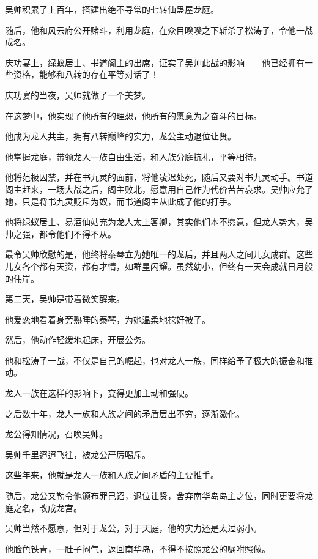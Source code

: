 
\begin{this_body}

吴帅积累了上百年，搭建出绝不寻常的七转仙蛊屋龙庭。

随后，他和风云府公开赌斗，利用龙庭，在众目睽睽之下斩杀了松涛子，令他一战成名。

庆功宴上，绿蚁居士、书道阁主的出席，证实了吴帅此战的影响——他已经拥有一些资格，能够和八转的存在平等对话了！

庆功宴的当夜，吴帅就做了一个美梦。

在这梦中，他实现了他所有的理想，他所有的愿意为之奋斗的目标。

他成为龙人共主，拥有八转巅峰的实力，龙公主动退位让贤。

他掌握龙庭，带领龙人一族自由生活，和人族分庭抗礼，平等相待。

他将范极囚禁，并在书九灵的面前，将他凌迟处死，随后又要对书九灵动手。书道阁主赶来，一场大战之后，阁主败北，愿意用自己作为代价苦苦哀求。吴帅应允了她，只是将书九灵贬斥为奴，而书道阁主从此成了他的打手。

他将绿蚁居士、易酒仙姑充为龙人太上客卿，其实他们本不愿意，但龙人势大，吴帅之强，都令他们不得不从。

最令吴帅欣慰的是，他终将泰琴立为她唯一的龙后，并且两人之间儿女成群。这些儿女各个都有天资，都有才情，如群星闪耀。虽然幼小，但终有一天会成就日月般的伟岸。

第二天，吴帅是带着微笑醒来。

他爱恋地看着身旁熟睡的泰琴，为她温柔地捻好被子。

然后，他动作轻缓地起床，开展公务。

他和松涛子一战，不仅是自己的崛起，也对龙人一族，同样给予了极大的振奋和推动。

龙人一族在这样的影响下，变得更加主动和强硬。

之后数十年，龙人一族和人族之间的矛盾层出不穷，逐渐激化。

龙公得知情况，召唤吴帅。

吴帅千里迢迢飞往，被龙公严厉喝斥。

这些年来，他就是龙人一族和人族之间矛盾的主要推手。

随后，龙公又勒令他颁布罪己诏，退位让贤，舍弃南华岛岛主之位，同时更要将龙庭之名，改成龙宫。

吴帅当然不愿意，但对于龙公，对于天庭，他的实力还是太过弱小。

他脸色铁青，一肚子闷气，返回南华岛，不得不按照龙公的嘱咐照做。


\end{this_body}
